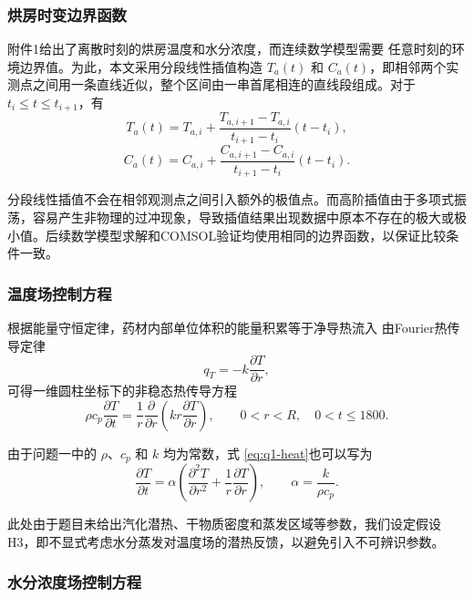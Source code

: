 \documentclass[12pt,a4paper]{article}
\renewcommand{\boxed}[1]{#1}
\begin{document}
\subsubsection{烘房时变边界函数}

附件1给出了离散时刻的烘房温度和水分浓度，而连续数学模型需要
任意时刻的环境边界值。为此，本文采用分段线性插值构造
$T_a(t)$ 和 $C_a(t)$，即相邻两个实测点之间用一条直线近似，整个区间由一串首尾相连的直线段组成。对于 $t_i\le t\le t_{i+1}$，有
\begin{equation}
T_a(t)
=
T_{a,i}
+
\frac{T_{a,i+1}-T_{a,i}}{t_{i+1}-t_i}
(t-t_i),
\end{equation}
\begin{equation}
C_a(t)
=
C_{a,i}
+
\frac{C_{a,i+1}-C_{a,i}}{t_{i+1}-t_i}
(t-t_i).
\end{equation}

分段线性插值不会在相邻观测点之间引入额外的极值点。而高阶插值由于多项式振荡，容易产生非物理的过冲现象，导致插值结果出现数据中原本不存在的极大或极小值。后续数学模型求解和COMSOL验证均使用相同的边界函数，以保证比较条件一致。

\subsubsection{温度场控制方程}

根据能量守恒定律，药材内部单位体积的能量积累等于净导热流入
由Fourier热传导定律
\begin{equation}
q_T=-k\frac{\partial T}{\partial r},
\end{equation}
可得一维圆柱坐标下的非稳态热传导方程
\begin{equation}
\boxed{
\rho c_p\frac{\partial T}{\partial t}
=
\frac{1}{r}
\frac{\partial}{\partial r}
\left(
kr\frac{\partial T}{\partial r}
\right)
},
\qquad
0<r<R,\quad 0<t\le1800.
\label{eq:q1-heat}
\end{equation}

由于问题一中的 $\rho$、$c_p$ 和 $k$ 均为常数，式
\eqref{eq:q1-heat}也可以写为
\begin{equation}
\frac{\partial T}{\partial t}
=
\alpha
\left(
\frac{\partial^2T}{\partial r^2}
+
\frac{1}{r}\frac{\partial T}{\partial r}
\right),
\qquad
\alpha=\frac{k}{\rho c_p}.
\end{equation}

此处由于题目未给出汽化潜热、干物质密度和蒸发区域等参数，我们设定假设H3，即不显式考虑水分蒸发对温度场的潜热反馈，以避免引入不可辨识参数。

\subsubsection{水分浓度场控制方程}
\end{document}
